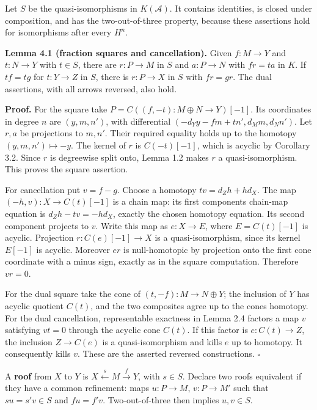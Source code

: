 \documentclass[
  english,
  11pt,
  a4paper,
]{article}
\begin{document}
Let \(S\) be the quasi-isomorphisms in \(K(\mathcal A)\). It contains
identities, is closed under composition, and has the two-out-of-three
property, because these assertions hold for isomorphisms after every
\(H^n\).

\textbf{Lemma 4.1 (fraction squares and cancellation).} Given
\(f:M\to Y\) and \(t:N\to Y\) with \(t\in S\), there are \(r:P\to M\) in
\(S\) and \(a:P\to N\) with \(fr=ta\) in \(K\). If \(tf=tg\) for
\(t:Y\to Z\) in \(S\), there is \(r:P\to X\) in \(S\) with \(fr=gr\).
The dual assertions, with all arrows reversed, also hold.

\textbf{Proof.} For the square take \(P=C((f,-t):M\oplus N\to Y)[-1]\).
Its coordinates in degree \(n\) are \((y,m,n')\), with differential
\((-d_Yy-fm+tn',d_Mm,d_Nn')\). Let \(r,a\) be projections to \(m,n'\).
Their required equality holds up to the homotopy \((y,m,n')\mapsto-y\).
The kernel of \(r\) is \(C(-t)[-1]\), which is acyclic by Corollary 3.2.
Since \(r\) is degreewise split onto, Lemma 1.2 makes \(r\) a
quasi-isomorphism. This proves the square assertion.

For cancellation put \(v=f-g\). Choose a homotopy \(tv=d_Zh+hd_X\). The
map \((-h,v):X\to C(t)[-1]\) is a chain map: its first
component\textquotesingle s chain-map equation is \(d_Zh-tv=-hd_X\),
exactly the chosen homotopy equation. Its second component projects to
\(v\). Write this map as \(e:X\to E\), where \(E=C(t)[-1]\) is acyclic.
Projection \(r:C(e)[-1]\to X\) is a quasi-isomorphism, since its kernel
\(E[-1]\) is acyclic. Moreover \(er\) is null-homotopic by projection
onto the first cone coordinate with a minus sign, exactly as in the
square computation. Therefore \(vr=0\).

For the dual square take the cone of \((t,-f):M\to N\oplus Y\); the
inclusion of \(Y\) has acyclic quotient \(C(t)\), and the two composites
agree up to the cone\textquotesingle s homotopy. For the dual
cancellation, representable exactness in Lemma 2.4 factors a map \(v\)
satisfying \(vt=0\) through the acyclic cone \(C(t)\). If this factor is
\(e:C(t)\to Z\), the inclusion \(Z\to C(e)\) is a quasi-isomorphism and
kills \(e\) up to homotopy. It consequently kills \(v\). These are the
asserted reversed constructions. \(\square\)

A \textbf{roof} from \(X\) to \(Y\) is
\(X\xleftarrow{s}M\xrightarrow{f}Y\), with \(s\in S\). Declare two roofs
equivalent if they have a common refinement: maps \(u:P\to M\),
\(v:P\to M'\) such that \(su=s'v\in S\) and \(fu=f'v\). Two-out-of-three
then implies \(u,v\in S\).
\end{document}

